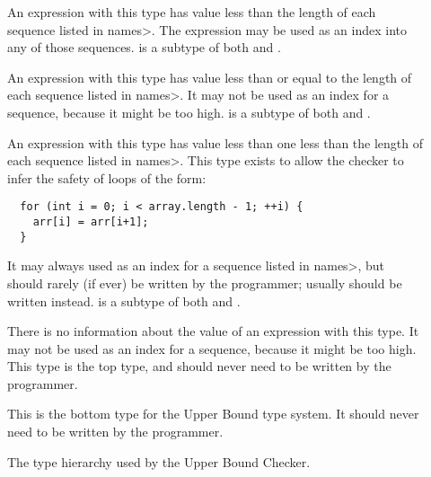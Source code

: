 \begin{description}
\item[]
  An expression with this type
  has value less than the length of each sequence listed in \<names>.
  The expression may be used as an index into any of those sequences.
   is a subtype of both
   and .
\item[]
  An expression with this type
  has value less than or equal to the length of each sequence listed in \<names>.
  It may not be used as an index for a sequence, because it might be too high.
   is a subtype of both
   and .
\item[]
  An expression with this type
  has value less than one less than the length of each sequence listed in \<names>. This type exists to allow the checker to infer the safety of loops of
  the form:
\begin{Verbatim}
  for (int i = 0; i < array.length - 1; ++i) {
    arr[i] = arr[i+1];
  }
\end{Verbatim}
It may always used as an index for a sequence listed in \<names>, but
should rarely (if ever) be written by the programmer; usually
should be written instead.
   is a subtype of both
   and .
\item[]
  There is no information about the value of an expression with this type.
  It may not be used as an index for a sequence, because it might be too high.
  This type is the top type, and should never need to be written by the
  programmer.
\item[]
  This is the bottom type for the Upper Bound type system. It should
  never need to be written by the programmer.
  \end{description}

\begin{figure}
  \caption{The type hierarchy used by the Upper Bound Checker.}
  \label{fig-upperbound-types}
\end{figure}

